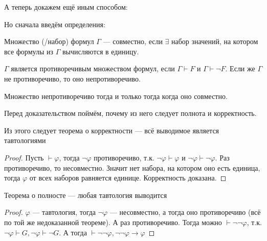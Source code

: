 А теперь докажем ещё иным способом:

Но сначала введём определения:

\begin{definition}
	Множество (/набор) формул $\Gamma$ --- совместно, если $\exists$ набор значений, на котором все формулы из $\Gamma$ вычисляются в единицу.
\end{definition}

\begin{definition}
	$\Gamma$ является противоречивым множеством формул, если $\Gamma \vdash F$ и $\Gamma \vdash \lnot F$. Если же $\Gamma$ не противоречиво, то оно непротиворечиво. 
\end{definition}

\begin{theorem}
	Множество непротиворечиво тогда и только тогда когда оно совместно. 
\end{theorem}

Перед доказательством поймём, почему из него следует полнота и корректность. 

\begin{theorem}
	Из этого следует теорема о корректности --- всё выводимое является тавтологиями
\end{theorem}
\begin{proof}
	Пусть $\vdash \varphi$, тогда $\lnot \varphi$ противоречиво, т.к. $\lnot \varphi \vdash \varphi$ и $\lnot \varphi \vdash \lnot \varphi$. Раз противоречиво, то несовместно. Значит нет набора, на котором оно есть единица, тогда $\varphi$ от всех наборов равняется единице. Корректность доказана. 
\end{proof}

\begin{theorem}
	Теорема о полносте --- любая тавтология выводится
\end{theorem}
\begin{proof}
	$\varphi$ --- тавтология, тогда $\lnot \varphi$ --- несовместно, а тогда оно противоречиво (всё по той же недоказанной теореме). А раз противоречиво. Тогда можно $\vdash \lnot \lnot \varphi$, т.к. $\lnot \varphi \vdash G, \lnot \varphi \vdash \lnot G$. А тогда $\vdash \lnot \lnot \varphi, \lnot \lnot \varphi \to \varphi$
\end{proof}

